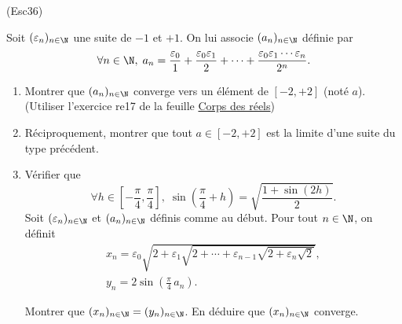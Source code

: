 \begin{tiny}(Esc36)\end{tiny} Soit $(\varepsilon_n)_{n\in \N}$ une suite de $-1$ et $+1$. On lui associe $(a_n)_{n\in \N}$ définie par
\[
  \forall n \in \N,\;
  a_n = \frac{\varepsilon_0}{1} + \frac{\varepsilon_0 \varepsilon_1}{2} + \cdots + \frac{\varepsilon_0 \varepsilon_1 \cdots \varepsilon_n}{2^n}.
\]
\begin{enumerate}
  \item Montrer que $(a_n)_{n\in \N}$ converge vers un élément de $\left[-2, +2 \right]$ (noté $a$). \newline
  (Utiliser l'exercice re17 de la feuille \href{\exosurl _fex_re.pdf}{Corps des réels})
  \item Réciproquement, montrer que tout $a \in \left[-2, +2 \right]$ est la limite d'une suite du type précédent.
  \item Vérifier que 
\[
  \forall h \in \left[ -\frac{\pi}{4}, \frac{\pi}{4}\right],\;
  \sin(\frac{\pi}{4} + h) 
  =  \sqrt{\frac{1 + \sin(2h)}{2}}.
\]
Soit $(\varepsilon_n)_{n\in \N}$ et $(a_n)_{n\in \N}$ définis comme au début. Pour tout $n\in \N$, on définit
\begin{multline*}
  x_n = \varepsilon_0\sqrt{2 + \varepsilon_1\sqrt{2 + \cdots + \varepsilon_{n-1}\sqrt{2+\varepsilon_n\sqrt{2}}}}, \\
  y_n = 2 \sin(\frac{\pi}{4}\,a_n).
\end{multline*}

Montrer que $(x_n)_{n\in \N} = (y_n)_{n\in \N}$. En déduire que $(x_n)_{n\in \N}$ converge.
\end{enumerate}
